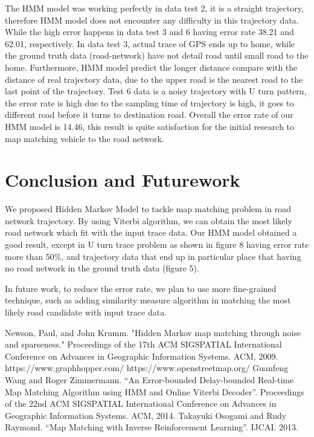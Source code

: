 \documentclass[a4paper]{article}
\begin{document}
The HMM model was working perfectly in data test 2, it is a straight trajectory, therefore HMM model does not encounter any difficulty in this trajectory data. While the high error happens in data test 3 and 6 having error rate 38.21 and 62.01, respectively. In data test 3, actual trace of GPS ends up to home, while the ground truth data (road-network) have not detail road until small road to the home. Furthermore, HMM model predict the longer distance compare with the distance of real trajectory data, due to the upper road is the nearest road to the last point of the trajectory. Test 6 data is a noisy trajectory with U turn pattern, the error rate is high due to the sampling time of trajectory is high, it goes to different road before it turns to destination road. Overall the error rate of our HMM model is 14.46, this result is quite satisfaction for the initial research to map matching vehicle to the road network.

\section{Conclusion and Futurework}
\label{sec:conclusion}

We proposed Hidden Markov Model to tackle map matching problem in road network trajectory. By using Viterbi algorithm, we can obtain the most likely road network which fit with the input trace data. Our HMM model obtained a good result, except in U turn trace problem as shown in figure 8 having error rate more than 50\%, and trajectory data that end up in particular place that having no road network in the ground truth data (figure 5).

In future work, to reduce the error rate, we plan to use more fine-grained technique, such as adding similarity measure algorithm in matching the most likely road candidate with input trace data.


\begin{thebibliography}{9}
Newson, Paul, and John Krumm. "Hidden Markov map matching through noise and sparseness." Proceedings of the 17th ACM SIGSPATIAL International Conference on Advances in Geographic Information Systems. ACM, 2009.
https://www.graphhopper.com/ 
https://www.openstreetmap.org/ 
Guanfeng Wang and Roger Zimmermann. “An Error-bounded Delay-bounded Real-time Map Matching Algorithm using HMM and Online Viterbi Decoder”. Proceedings of the 22nd ACM SIGSPATIAL International Conference on Advances in Geographic Information Systems. ACM, 2014.
Takayuki Osogami and Rudy Raymond. “Map Matching with Inverse Reinforcement Learning”. IJCAI. 2013.
\end{thebibliography}
\end{document}
